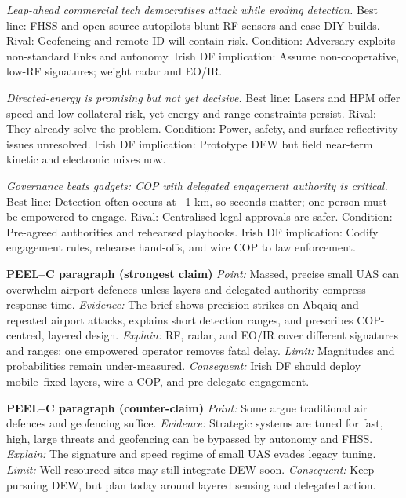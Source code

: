 \textit{Leap-ahead commercial tech democratises attack while eroding detection.} Best line: FHSS and open-source autopilots blunt RF sensors and ease DIY builds. Rival: Geofencing and remote ID will contain risk. Condition: Adversary exploits non-standard links and autonomy. Irish DF implication: Assume non-cooperative, low-RF signatures; weight radar and EO/IR.

\textit{Directed-energy is promising but not yet decisive.} Best line: Lasers and HPM offer speed and low collateral risk, yet energy and range constraints persist. Rival: They already solve the problem. Condition: Power, safety, and surface reflectivity issues unresolved. Irish DF implication: Prototype DEW but field near-term kinetic and electronic mixes now.

\textit{Governance beats gadgets: COP with delegated engagement authority is critical.} Best line: Detection often occurs at ~1 km, so seconds matter; one person must be empowered to engage. Rival: Centralised legal approvals are safer. Condition: Pre-agreed authorities and rehearsed playbooks. Irish DF implication: Codify engagement rules, rehearse hand-offs, and wire COP to law enforcement.

\textbf{PEEL–C paragraph (strongest claim)}
\textit{Point:} Massed, precise small UAS can overwhelm airport defences unless layers and delegated authority compress response time.
\textit{Evidence:} The brief shows precision strikes on Abqaiq and repeated airport attacks, explains short detection ranges, and prescribes COP-centred, layered design.
\textit{Explain:} RF, radar, and EO/IR cover different signatures and ranges; one empowered operator removes fatal delay.
\textit{Limit:} Magnitudes and probabilities remain under-measured.
\textit{Consequent:} Irish DF should deploy mobile–fixed layers, wire a COP, and pre-delegate engagement.

\textbf{PEEL–C paragraph (counter-claim)}
\textit{Point:} Some argue traditional air defences and geofencing suffice.
\textit{Evidence:} Strategic systems are tuned for fast, high, large threats and geofencing can be bypassed by autonomy and FHSS.
\textit{Explain:} The signature and speed regime of small UAS evades legacy tuning.
\textit{Limit:} Well-resourced sites may still integrate DEW soon.
\textit{Consequent:} Keep pursuing DEW, but plan today around layered sensing and delegated action.

